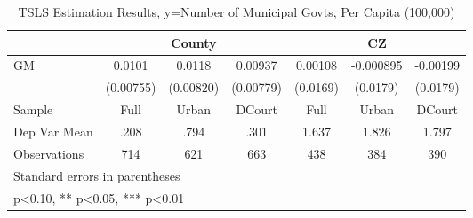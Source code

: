 \begin{table}[htbp]\centering
\def\sym#1{\ifmmode^{#1}\else\(^{#1}\)\fi}
\caption{TSLS Estimation Results, y=Number of Municipal Govts, Per Capita (100,000)}
\begin{tabular}{l*{6}{c}}
\toprule
                &\multicolumn{3}{c}{County}            &\multicolumn{3}{c}{CZ}                \\\cmidrule(lr){2-4}\cmidrule(lr){5-7}
\midrule
GM              &   0.0101   &   0.0118   &  0.00937   &  0.00108   &-0.000895   & -0.00199   \\
                &(0.00755)   &(0.00820)   &(0.00779)   & (0.0169)   & (0.0179)   & (0.0179)   \\
\midrule
Sample          &     Full   &    Urban   &   DCourt   &     Full   &    Urban   &   DCourt   \\
Dep Var Mean    &     .208   &     .794   &     .301   &    1.637   &    1.826   &    1.797   \\
Observations    &      714   &      621   &      663   &      438   &      384   &      390   \\
\bottomrule
\multicolumn{7}{l}{\footnotesize Standard errors in parentheses}\\
\multicolumn{7}{l}{\footnotesize * p<0.10, ** p<0.05, *** p<0.01}\\
\end{tabular}
\end{table}
